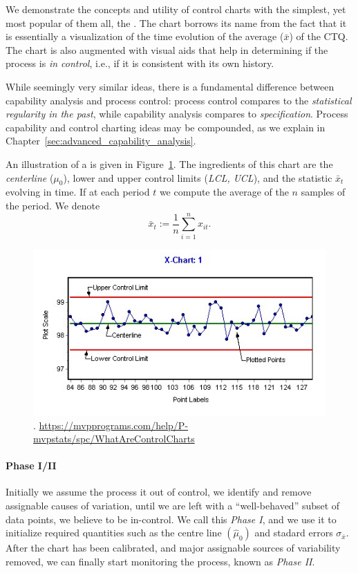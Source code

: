 We demonstrate the concepts and utility of control charts with the simplest, yet most popular of them all, the \barxChart. 
The chart borrows its name from the fact that it is essentially a visualization of the time evolution of the average ($\bar{x}$) of the CTQ. 
The chart is also augmented with visual aids that help in determining if the process is \emph{in control}, i.e., if it is consistent with its own history. 

\begin{remark}
While seemingly very similar ideas, there is a fundamental difference between capability analysis and process control:  process control compares to the \emph{statistical regularity in the past}, while capability analysis compares to \emph{specification}.
Process capability and control charting ideas may be compounded, as we explain in Chapter~\ref{sec:advanced_capability_analysis}.
\end{remark}


An illustration of a \barxChart is given in Figure~\ref{fig:bar_x_chart}. 
The ingredients of this chart are the \emph{centerline} ($\mu_0$), lower and upper control limits (\emph{LCL, UCL}), and the statistic $\bar{x}_t$ evolving in time. 
If at each period $t$ we compute the average of the $n$ samples of the period. We denote $$\bar{x}_t:=\frac 1n \sum_{i=1}^n x_{it}.$$

\begin{figure}[ht]
\centering
\includegraphics[height=0.3\textheight]{art/X-chartExample}
\caption[\barxChart]{\barxChart. \newline \url{https://mvpprograms.com/help/P-mvpstats/spc/WhatAreControlCharts}}
\label{fig:bar_x_chart}
\end{figure}

\paragraph{Phase I/II} 
Initially we assume the process it out of control, we identify and remove assignable causes of variation, until we are left with a ``well-behaved'' subset of data points, we believe to be in-control. 
We call this \emph{Phase I}, and we use it to initialize required quantities such as the centre line $(\hat{\mu}_0)$ and stadard errors $\sigma_{\bar{x}}$. 
After the chart has been calibrated, and major assignable sources of variability removed, we can finally start monitoring the process, known as \emph{Phase II}.


